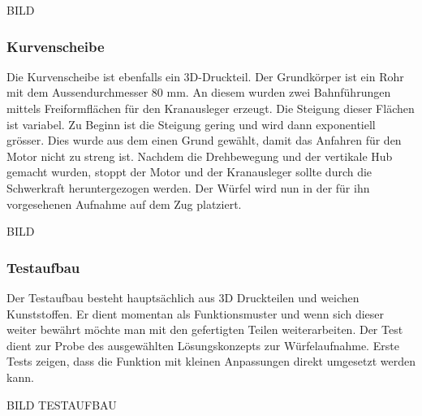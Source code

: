 \documentclass[../../main.tex]{subfiles}
\begin{document}
BILD

        \subsubsection{Kurvenscheibe}
        Die Kurvenscheibe ist ebenfalls ein 3D-Druckteil. Der Grundkörper ist ein Rohr mit dem Aussendurchmesser 80 mm. An diesem wurden zwei Bahnführungen mittels Freiformflächen für den Kranausleger erzeugt. Die Steigung dieser Flächen ist variabel. Zu Beginn ist die Steigung gering und wird dann exponentiell grösser. Dies wurde aus dem einen Grund gewählt, damit das Anfahren für den Motor nicht zu streng ist. Nachdem die Drehbewegung und der vertikale Hub gemacht wurden, stoppt der Motor und der Kranausleger sollte durch die Schwerkraft heruntergezogen werden. Der Würfel wird nun in der für ihn vorgesehenen Aufnahme auf dem Zug platziert.


BILD



        \subsubsection{Testaufbau}
        Der Testaufbau besteht hauptsächlich aus 3D Druckteilen und weichen Kunststoffen. Er dient momentan als Funktionsmuster und wenn sich dieser weiter bewährt möchte man mit den gefertigten Teilen weiterarbeiten. Der Test dient zur Probe des ausgewählten Lösungskonzepts zur Würfelaufnahme. Erste Tests zeigen, dass die Funktion mit kleinen Anpassungen direkt umgesetzt werden kann.

        BILD TESTAUFBAU
\end{document}

